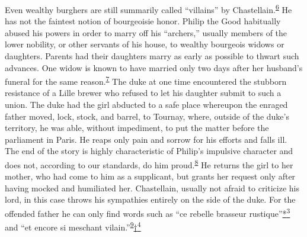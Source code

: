 Even wealthy burghers are still summarily called ``villains'' by
Chastellain.\textsuperscript{\protect\hypertarget{10_Chapter_Three__THE_HEROIC_DREAM.xhtmlux5cux23id_1919}{\protect\hyperlink{23_NOTES.xhtmlux5cux23id_1920}{6}}}
He has not the faintest notion of bourgeoisie honor. Philip the Good
habitually abused his powers in order to marry off his ``archers,''
usually members of the lower nobility, or other servants of his house,
to wealthy bourgeois widows or daughters. Parents had their daughters
marry as early as possible to thwart such advances. One widow is known
to have married only two days after her husband's funeral for the same
reason.\textsuperscript{\protect\hypertarget{10_Chapter_Three__THE_HEROIC_DREAM.xhtmlux5cux23id_1917}{\protect\hyperlink{23_NOTES.xhtmlux5cux23id_1918}{7}}}
The duke at one time encountered the stubborn resistance of a Lille
brewer who refused to let his daughter submit to such a union. The duke
had the girl abducted to a safe place whereupon the enraged father
\protect\hypertarget{10_Chapter_Three__THE_HEROIC_DREAM.xhtmlux5cux23page_65}{}{}moved,
lock, stock, and barrel, to Tournay, where, outside of the duke's
territory, he was able, without impediment, to put the matter before the
parliament in Paris. He reaps only pain and sorrow for his efforts and
falls ill. The end of the story is highly characteristic of Philip's
impulsive character and does not, according to our standards, do him
proud.\textsuperscript{\protect\hypertarget{10_Chapter_Three__THE_HEROIC_DREAM.xhtmlux5cux23id_1915}{\protect\hyperlink{23_NOTES.xhtmlux5cux23id_1916}{8}}}
He returns the girl to her mother, who had come to him as a supplicant,
but grants her request only after having mocked and humiliated her.
Chastellain, usually not afraid to criticize his lord, in this case
throws his sympathies entirely on the side of the duke. For the offended
father he can only find words such as ``ce rebelle brasseur
rustique''\protect\hypertarget{10_Chapter_Three__THE_HEROIC_DREAM.xhtmlux5cux23id_2469}{\protect\hyperlink{23_NOTES.xhtmlux5cux23id_2470}{*\textsuperscript{3}}}
and ``et encore si meschant
vilain.''\textsuperscript{\protect\hypertarget{10_Chapter_Three__THE_HEROIC_DREAM.xhtmlux5cux23id_1913}{\protect\hyperlink{23_NOTES.xhtmlux5cux23id_1914}{9}}}\protect\hypertarget{10_Chapter_Three__THE_HEROIC_DREAM.xhtmlux5cux23id_2471}{\protect\hyperlink{23_NOTES.xhtmlux5cux23id_2472}{†\textsuperscript{4}}}

